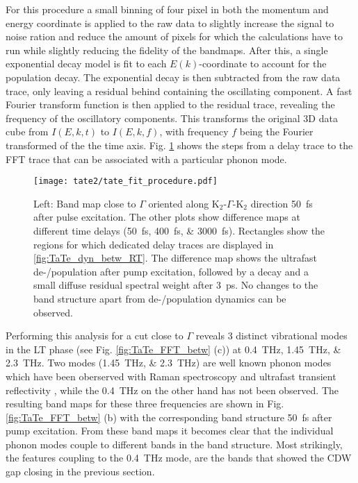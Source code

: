 For this procedure a small binning of four pixel in both the momentum and energy coordinate is applied to the raw data to slightly increase the signal to noise ration and reduce the amount of pixels for which the calculations have to run while slightly reducing the fidelity of the bandmaps.
After this, a single exponential decay model is fit to each $E(k)$-coordinate to account for the population decay.
The exponential decay is then subtracted from the raw data trace, only leaving a residual behind containing the oscillating component.
A fast Fourier transform function is then applied to the residual trace, revealing the frequency of the oscillatory components.
This transforms the original 3D data cube from $I(E,k,t)$ to $I(E,k,f)$, with frequency $f$ being the Fourier transformed of the the time axis.
Fig. \ref{fig:TaTe_fit_procedure} shows the steps from a delay trace to the FFT trace that can be associated with a particular phonon mode.

\begin{figure}[t!]
	\centering
	\texttt{[image: tate2/tate\_fit\_procedure.pdf]}
	\caption{Left: Band map close to $\Gamma$ oriented along K$_2$-$\Gamma$-K$_2$ direction \qty{50}{\femto\second} after pulse excitation. The other plots show difference maps at different time delays (\qtylist{50;400;3000}{\femto\second}). Rectangles show the regions for which dedicated delay traces are displayed in \ref{fig:TaTe_dyn_betw_RT}. The difference map shows the ultrafast de-/population after pump excitation, followed by a decay and a small diffuse residual spectral weight after \qty{3}{\pico\second}. No changes to the band structure apart from de-/population dynamics can be observed.}
	\label{fig:TaTe_fit_procedure}
\end{figure}

Performing this analysis for a cut close to $\Gamma$ reveals 3 distinct vibrational modes in the LT phase (see Fig. \ref{fig:TaTe_FFT_betw} (c)) at \qtylist{0.4; 1.45; 2.3}{\tera\hertz}.
Two modes (\qtylist{1.45; 2.3}{\tera\hertz}) are well known phonon modes which have been oberserved with Raman spectroscopy and ultrafast transient reflectivity \cite{luo, hu_optical_2022}, while the \qty{0.4}{\tera\hertz} on the other hand has not been observed.
The resulting band maps for these three frequencies are shown in Fig. \ref{fig:TaTe_FFT_betw} (b) with the corresponding band structure \qty{50}{\femto\second} after pump excitation.
From these band maps it becomes clear that the individual phonon modes couple to different bands in the band structure.
Most strikingly, the features coupling to the \qty{0.4}{\tera\hertz} mode, are the bands that showed the CDW gap closing in the previous section.

